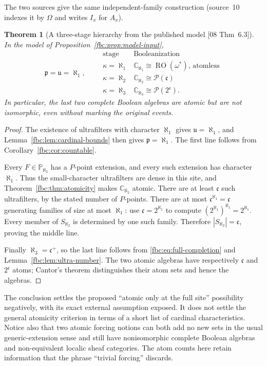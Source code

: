 \documentclass[11pt,letterpaper]{article}
\newtheorem{theorem}{Theorem}[section]
\theoremstyle{definition}
\theoremstyle{remark}
\newcommand{\om}{\omega}
\newcommand{\C}{\mathbb C}
\newcommand{\PP}{\mathbb P}
\newcommand{\pow}{\mathcal P}
\newcommand{\cp}{\mathfrak p}
\newcommand{\cu}{\mathfrak u}
\newcommand{\cc}{\mathfrak c}
\newcommand{\RO}{\operatorname{RO}}
\newcommand{\src}[1]{\textup{[#1]}}
\begin{document}
The two sources give the same independent-family construction (source~10
indexes it by $\Omega$ and writes $I_x$ for $A_x$).

\begin{theorem}[A three-stage hierarchy from the published model \src{08 Thm~6.3}]
\label{fbc:thm:early-atomicity}
In the model of Proposition~\ref{fbc:prop:model-input},
\[
 \cp=\cu=\aleph_1,
 \qquad
 \begin{array}{c|c}
 \text{stage}&\text{Booleanization}\\ \hline
 \kappa=\aleph_1&\C_{\aleph_1}\cong\RO(\om^*)\text{, atomless}\\
 \kappa=\aleph_2&\C_{\aleph_2}\cong\pow(\cc)\\
 \kappa=\aleph_3&\C_{\aleph_3}\cong\pow(2^\cc).
 \end{array}
\]
In particular, the last two complete Boolean algebras are atomic but
are not isomorphic, even without marking the original events.
\end{theorem}
\begin{proof}
The existence of ultrafilters with character $\aleph_1$ gives
$\cu=\aleph_1$, and Lemma~\ref{fbc:lem:cardinal-bounds} then gives
$\cp=\aleph_1$. The first line follows from
Corollary~\ref{fbc:cor:countable}.

Every $F\in\PP_{\aleph_2}$ has a $P$-point extension, and every
such extension has character $\aleph_1$. Thus the small-character
ultrafilters are dense in this site, and
Theorem~\ref{fbc:thm:atomicity} makes $\C_{\aleph_2}$ atomic.
There are at least $\cc$ such ultrafilters, by the stated number
of $P$-points. There are at most $\cc^{\aleph_1}=\cc$ generating
families of size at most $\aleph_1$: use
$\cc=2^{\aleph_1}$ to compute
$(2^{\aleph_1})^{\aleph_1}=2^{\aleph_1}$. Every member of
$S_{\aleph_2}$ is determined by one such family. Therefore
$|S_{\aleph_2}|=\cc$, proving the middle line.

Finally $\aleph_3=\cc^+$, so the last line follows from
\eqref{fbc:eq:full-completion} and Lemma~\ref{fbc:lem:ultra-number}.
The two atomic algebras have respectively $\cc$ and $2^\cc$
atoms; Cantor's theorem distinguishes their atom sets and hence
the algebras.
\end{proof}

The conclusion settles the proposed ``atomic only at the full site''
possibility negatively, with its exact external assumption exposed.
It does not settle the general atomicity criterion in terms of a
short list of cardinal characteristics. Notice also that two atomic
forcing notions can both add no new sets in the usual generic-extension
sense and still have nonisomorphic complete Boolean algebras and
non-equivalent localic sheaf categories. The atom counts here retain
information that the phrase ``trivial forcing'' discards.
\end{document}

